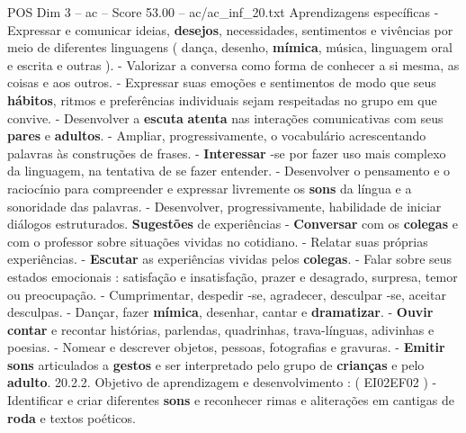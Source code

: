 \begin{textsample}{POS Dim 3 – ac – Score 53.00 – ac/ac\_inf\_20.txt}
Aprendizagens específicas - Expressar e comunicar ideias, \textbf{desejos}, necessidades, sentimentos e vivências por meio de diferentes linguagens ( dança, desenho, \textbf{mímica}, música, linguagem oral e escrita e outras ). - Valorizar a conversa como forma de conhecer a si mesma, as coisas e aos outros. - Expressar suas emoções e sentimentos de modo que seus \textbf{hábitos}, ritmos e preferências individuais sejam respeitadas no grupo em que convive. - Desenvolver a \textbf{escuta} \textbf{atenta} nas interações comunicativas com seus \textbf{pares} e \textbf{adultos}. - Ampliar, progressivamente, o vocabulário acrescentando palavras às construções de frases. - \textbf{Interessar} -se por fazer uso mais complexo da linguagem, na tentativa de se fazer entender. - Desenvolver o pensamento e o raciocínio para compreender e expressar livremente os \textbf{sons} da língua e a sonoridade das palavras. - Desenvolver, progressivamente, habilidade de iniciar diálogos estruturados. \textbf{Sugestões} de experiências - \textbf{Conversar} com os \textbf{colegas} e com o professor sobre situações vividas no cotidiano. - Relatar suas próprias experiências. - \textbf{Escutar} as experiências vividas pelos \textbf{colegas}. - Falar sobre seus estados emocionais : satisfação e insatisfação, prazer e desagrado, surpresa, temor ou preocupação. - Cumprimentar, despedir -se, agradecer, desculpar -se, aceitar desculpas. - Dançar, fazer \textbf{mímica}, desenhar, cantar e \textbf{dramatizar}. - \textbf{Ouvir} \textbf{contar} e recontar histórias, parlendas, quadrinhas, trava-línguas, adivinhas e poesias. - Nomear e descrever objetos, pessoas, fotografias e gravuras. - \textbf{Emitir} \textbf{sons} articulados a \textbf{gestos} e ser interpretado pelo grupo de \textbf{crianças} e pelo \textbf{adulto}. 20.2.2.
Objetivo de aprendizagem e desenvolvimento : ( EI02EF02 ) - Identificar e criar diferentes \textbf{sons} e reconhecer rimas e aliterações em cantigas de \textbf{roda} e textos poéticos.

\end{textsample}
